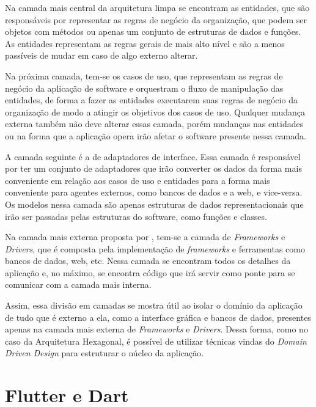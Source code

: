 \documentclass[12pt, %
openright, 
oneside, %
a4paper,    %
brazil]{facom-ufu-abntex2}
\begin{document}
Na camada mais central da arquitetura limpa se encontram as entidades, que são responsáveis por representar as regras de negócio da organização, que podem ser objetos com métodos ou apenas um conjunto de estruturas de dados e funções. As entidades representam as regras gerais de mais alto nível e são a menos passíveis de mudar em caso de algo externo alterar.

Na próxima camada, tem-se os casos de uso, que representam as regras de negócio da aplicação de software e orquestram o fluxo de manipulação das entidades, de forma a fazer as entidades executarem suas regras de negócio da organização de modo a atingir os objetivos dos casos de uso. Qualquer mudança externa também não deve alterar essas camada, porém mudanças nas entidades ou na forma que a aplicação opera irão afetar o software presente nessa camada.

A camada seguinte é a de adaptadores de interface. Essa camada é responsável por ter um conjunto de adaptadores que irão converter os dados da forma mais conveniente em relação aos casos de uso e entidades para a forma mais conveniente para agentes externos, como bancos de dados e a web, e vice-versa. Os modelos nessa camada são apenas estruturas de dados representacionais que irão ser passadas pelas estruturas do software, como funções e classes.

Na camada mais externa proposta por , tem-se a camada de \textit{Frameworks} e \textit{Drivers}, que é composta pela implementação de \textit{frameworks} e ferramentas como bancos de dados, web, etc. Nessa camada se encontram todos os detalhes da aplicação e, no máximo, se encontra código que irá servir como ponte para se comunicar com a camada mais interna.

Assim, essa divisão em camadas se mostra útil ao isolar o domínio da aplicação de tudo que é externo a ela, como a interface gráfica e bancos de dados, presentes apenas na camada mais externa de \textit{Frameworks} e \textit{Drivers}. Dessa forma, como no caso da Arquitetura Hexagonal, é possível de utilizar técnicas vindas do \textit{Domain Driven Design} para estruturar o núcleo da aplicação.

\section{Flutter e Dart} \label{sec:flutter_dart}
\end{document}
